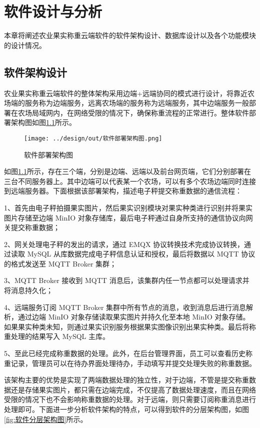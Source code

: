 \chapter{软件设计与分析}

本章将阐述农业果实称重云端软件的软件架构设计、数据库设计以及各个功能模块的设计情况。

\section{软件架构设计}\label{sec:architecture}

农业果实称重云端软件的整体架构采用边端+远端协同的模式进行设计，将靠近农场端的服务称为边端服务，远离农场端的服务称为远端服务，其中边端服务一般部署在农场局域网内，在网络受限的情况下，确保称重流程的正常进行。整体软件部署架构图如图\ref{fig:软件部署架构图}所示。

\begin{figure}[H]
    \centering
    \texttt{[image: ../design/out/软件部署架构图.png]}
    \caption{软件部署架构图}
    \label{fig:软件部署架构图}
\end{figure}

如图\ref{fig:软件部署架构图}所示，存在三个端，分别是边端、远端以及前台网页端，它们分别部署在三台不同服务器上。其中边端可以代表某一个农场，可以有多个农场边端同时连接到远端服务器。下面根据该部署架构，描述电子秤提交称重数据的通信流程：

1、首先由电子秤拍摄果实图片，然后果实识别模块对果实种类进行识别并将果实图片存储至边端 MinIO 对象存储库，最后电子秤通过自身所支持的通信协议向网关提交称重数据；

2、网关处理电子秤的发出的请求，通过 EMQX 协议转换技术完成协议转换，通过读取 MySQL 从库数据完成电子秤信息认证和授权，最后将数据以 MQTT 协议的格式发送至 MQTT Broker 集群；

3、MQTT Broker 接收到 MQTT 消息后，该集群内任一节点都可以处理请求并将消息持久化；

4、远端服务订阅 MQTT Broker 集群中所有节点的消息，收到消息后进行消息解析，通过边端 MinIO 对象存储读取果实图片并持久化至本地 MinIO 对象存储。如果果实种类未知，则通过果实识别服务根据果实图像识别出果实种类。最后将称重处理的结果写入 MySQL 主库。

5、至此已经完成称重数据的处理。此外，在后台管理界面，员工可以查看历史称重记录，管理员可以在待办界面处理待办，手动填写并提交处理失败的称重数据。

该架构主要的优势是实现了两端数据处理的独立性，对于边端，不管是提交称重数据还是存储果实图片，都只需在边端完成，不仅提高了数据处理速度，而且在网络受限的情况下也不会影响称重数据的处理。对于远端，则只需要订阅称重消息进行处理即可。下面进一步分析软件架构的特点，可以得到软件的分层架构图，如图\ref{fig:软件分层架构图}所示。

